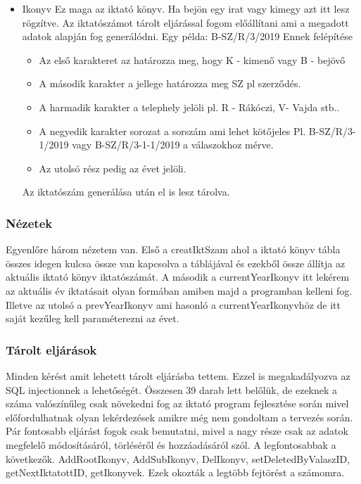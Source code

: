 \documentclass[conference]{IEEEtran}
\begin{document}
\begin{itemize}
	\item Ikonyv
	Ez maga az iktató könyv. Ha bejön egy irat vagy kimegy azt itt lesz rögzítve. Az iktatószámot tárolt eljárással fogom előállítani ami a megadott adatok alapján fog generálódni. Egy példa: B-SZ/R/3/2019 Ennek felépítése
	\begin{itemize}
		\item Az első karakteret az határozza meg, hogy K - kimenő vagy B - bejövő
		\item A második karakter a jellege határozza meg SZ pl szerződés.
		\item A harmadik karakter a telephely jelöli pl. R - Rákóczi, V- Vajda stb..
		\item A negyedik karakter sorozat a sorszám ami lehet kötőjeles Pl. B-SZ/R/3-1/2019 vagy B-SZ/R/3-1-1/2019 a válaszokhoz mérve.
		\item Az utolsó rész pedig az évet jelöli.
		
	\end{itemize}
	Az iktatószám generálása után el is lesz tárolva.
	
\end{itemize}
\subsubsection{\textbf{Nézetek}}
Egyenlőre három nézetem van. Első a creatIktSzam ahol a iktató könyv tábla összes idegen kulcsa össze van kapcsolva a táblájával és ezekből össze állítja az aktuális iktató könyv iktatószámát. A második a currentYearIkonyv itt lekérem az aktuális év iktatásait olyan formában amiben majd a programban kelleni fog. Illetve az utolsó a prevYearIkonyv ami hasonló a currentYearIkonyvhöz de itt saját kezűleg kell paraméterezni az évet.


\subsubsection{\textbf{Tárolt eljárások}}

Minden kérést amit lehetett tárolt eljárásba tettem. Ezzel is megakadályozva az SQL injectionnek a lehetőségét. Összesen 39 darab lett belőlük, de ezeknek a száma valószínűleg csak növekedni fog az iktató program fejlesztése során mivel előfordulhatnak olyan lekérdezések amikre még nem gondoltam a tervezés során.
Pár fontosabb eljárást fogok csak bemutatni, mivel a nagy része csak az adatok megfelelő módosításáról, törléséről és hozzáadásáról szól. A legfontosabbak a következők.
AddRootIkonyv, AddSubIkonyv, DelIkonyv, setDeletedByValaszID, getNextIktatottID, getIkonyvek. Ezek okozták a legtöbb fejtörést a számomra.
 
\end{document}
